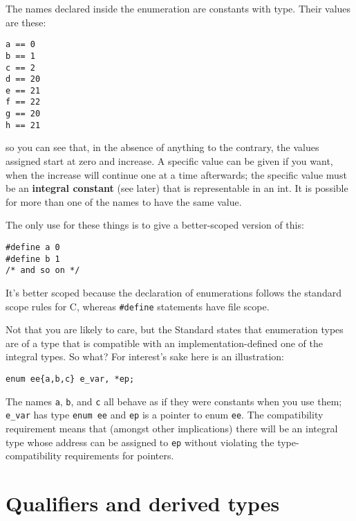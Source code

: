   The names declared inside the enumeration are constants with
   \kint{} type. Their values are these:


  \begin{Verbatim}
a == 0
b == 1
c == 2
d == 20
e == 21
f == 22
g == 20
h == 21
\end{Verbatim}

  so you can see that, in the absence of anything to the contrary, the
   values assigned start at zero and increase. A specific value can be given if
   you want, when the increase will continue one at a time afterwards; the
   specific value must be an \textbf{integral constant} (see later) that is
   representable in an int. It is possible for more than one of the names to
   have the same value.


  The only use for these things is to give a better-scoped version of
   this:


  \begin{Verbatim}
#define a 0
#define b 1
/* and so on */
\end{Verbatim}

  It's better scoped because the declaration of enumerations follows the
   standard scope rules for C, whereas \texttt{\#define} statements have
   file scope.


  Not that you are likely to care, but the Standard states that enumeration
   types are of a type that is compatible with an implementation-defined one of
   the integral types. So what? For interest's sake here is an
   illustration:


  \begin{Verbatim}
enum ee{a,b,c} e_var, *ep;
\end{Verbatim}

  The names \texttt{a}, \texttt{b}, and \texttt{c} all behave as
   if they were \kint{} constants when you use them;
   \texttt{e\_var} has type \texttt{enum ee} and \texttt{ep} is
   a pointer to enum \texttt{ee}. The compatibility requirement means that
   (amongst other implications) there will be an integral type whose address
   can be assigned to \texttt{ep} without violating the type-compatibility
   requirements for pointers.


 
        \section{Qualifiers and derived types}
        

